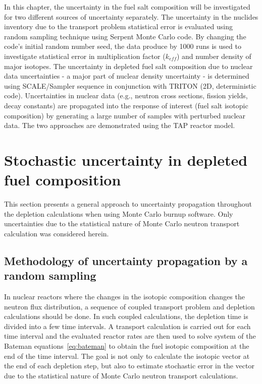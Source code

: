 In this chapter, the uncertainty in the fuel salt composition will be 
investigated for two different sources of uncertainty separately. The 
uncertainty in the nuclides inventory due to the transport problem statistical 
error is evaluated using random sampling technique using Serpent Monte Carlo 
code. By changing the code's initial random number seed, the data produce by 
1000 runs is used to investigate statistical error in multiplication factor 
($k_{eff}$) and number density of major isotopes. The uncertainty in depleted 
fuel salt composition due to nuclear data uncertainties - a major part of 
nuclear density uncertainty - is determined using SCALE/Sampler sequence in 
conjunction with TRITON (2D, deterministic code). Uncertainties in nuclear
data (e.g., neutron cross sections, fission yields, decay constants) are 
propagated into the response of interest (fuel salt isotopic composition) by 
generating a large number of samples with perturbed nuclear data. The two 
approaches are demonstrated using the \gls{TAP} reactor model.



\section{Stochastic uncertainty in depleted fuel composition}
This section presents a general approach to uncertainty propagation throughout 
the depletion calculations when using Monte Carlo burnup software. Only 
uncertainties due to the statistical
nature of Monte Carlo neutron transport 
calculation was considered herein. 

\subsection{Methodology of uncertainty propagation by a random sampling}
In nuclear reactors where the changes in the isotopic composition changes the 
neutron flux distribution, a sequence of coupled transport problem and 
depletion calculations should be done. In such coupled calculations, the 
depletion time is divided into a few time intervals. A transport calculation 
is carried out for each time interval and the evaluated reactor rates are then 
used to solve system of the Bateman equations~\ref{eq:bateman} to obtain the 
fuel isotopic composition at the end of the time interval. The goal is not 
only to calculate the isotopic vector at the end of each depletion step, but 
also to estimate stochastic error in the vector due to the statistical nature 
of Monte Carlo neutron transport calculations.

